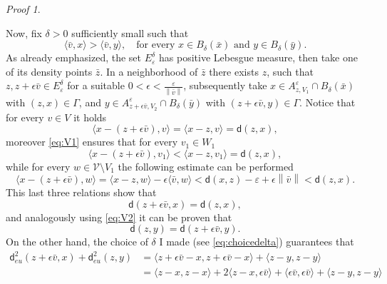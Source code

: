 \documentclass[11pt,twoside,a4paper]{article}
\newcommand{\scal}[2]{\ensuremath{\langle #1 , #2 \rangle}} %
\newcommand{\norm}[1]{\left\lVert#1\right\rVert}
\newcommand{\thmsymbol}{\( \square \)}
\newcommand{\di}{\mathsf d} %
\theoremstyle{theorem}
\theoremstyle{definition}
\theoremstyle{remark}
\theoremstyle{proof}
\newtheorem*{pro}{Proof}
\newenvironment{pr}{\begin{pro}%
 \renewcommand{\qedsymbol}{\thmsymbol}\pushQED{\qed}}%
 {\popQED\end{pro}}
\begin{document}
\begin{pr}
\begin{itemize}
    Now, fix $\delta>0$ sufficiently small such that 
    \begin{equation}\label{eq:choicedelta}
        \scal{\bar v}{x}> \scal{\bar v}{y}, \quad \text{for every } x \in B_\delta (\bar x) \text{ and } y \in B_\delta (\bar y). 
    \end{equation}
    As already emphasized, the set $E_\varepsilon^\delta$ has positive Lebesgue measure, then take one of its density points $\bar z$. In a neighborhood of $\bar z$ there exists $z$, such that $z, z + \epsilon \bar v \in E_\varepsilon^\delta$ for a suitable $0<\epsilon < \frac{\varepsilon}{\norm{\bar v}}$, subsequently take $x\in A_{z,V_1}^\varepsilon\cap B_\delta(\bar x)$ with $(z,x)\in \Gamma$, and $y\in A_{z+\epsilon \bar v,V_2}^\varepsilon \cap B_\delta(\bar y)$ with $(z+\epsilon \bar v,y)\in \Gamma$. Notice that for every $v\in V$ it holds 
    \begin{equation*}
        \scal{x-(z+\epsilon \bar v)}{v} = \scal{x-z}{v}= \di (z,x), 
    \end{equation*}
    moreover \eqref{eq:V1} ensures that for every $v_1 \in W_1$ 
    \begin{equation*}
        \scal{x-(z+\epsilon \bar v)}{v_1} < \scal{x-z}{v_1}= \di (z,x), 
    \end{equation*}
    while for every $w\in \mathcal V \setminus V_1$ the following estimate can be performed 
    \begin{equation*}
         \scal{x-(z+\epsilon \bar v)}{w} = \scal{x-z}{w}- \epsilon \scal{\bar v}{w}<  \di (x,z) -\varepsilon + \epsilon \norm{\bar v}  < \di (z,x). 
    \end{equation*}
    This last three relations show that 
    \begin{equation}\label{eq:equalitycrystalline1}
        \di(z+\epsilon \bar v, x) = \di (z, x),
    \end{equation}
    and analogously using \eqref{eq:V2} it can be proven that 
    \begin{equation}\label{eq:equalitycrystalline2}
         \di (z, y)=\di(z+\epsilon \bar v, y).
    \end{equation}
    On the other hand, the choice of $\delta$ I made (see \eqref{eq:choicedelta}) guarantees that 
    \begin{align*}
        \di_{eu}^2(z+\epsilon \bar v, x) + \di_{eu}^2(z,y) &= \scal{z+\epsilon \bar v-x}{ z+\epsilon \bar v -x} + \scal{z-y}{z-y} \\
        &= \scal{z-x}{z-x}+2\scal{z-x}{\epsilon \bar v}+\scal{\epsilon \bar v}{\epsilon \bar v}+ \scal{z-y}{z-y}\\

\end{align*}
\end{itemize}
\end{pr}
\end{document}
